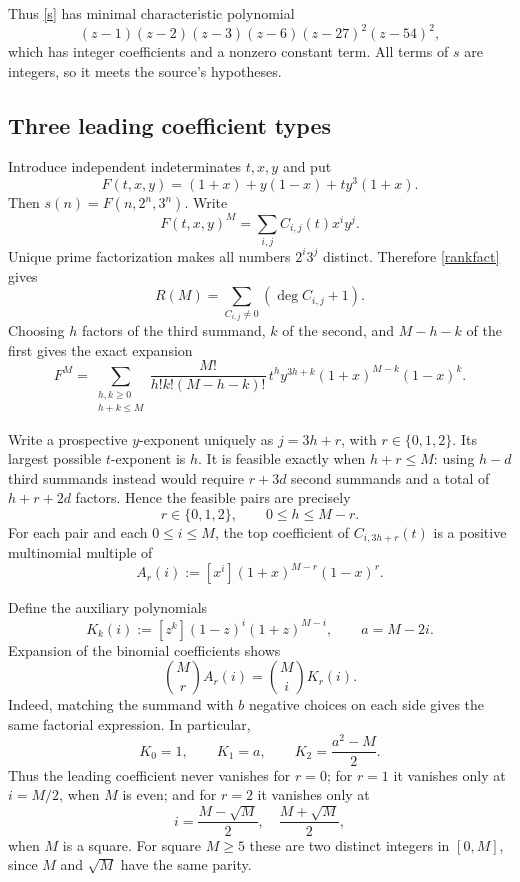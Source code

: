 \documentclass[11pt]{article}
\begin{document}
Thus \eqref{s} has minimal characteristic polynomial
\[
(z-1)(z-2)(z-3)(z-6)(z-27)^2(z-54)^2,
\]
which has integer coefficients and a nonzero constant term.
All terms of $s$ are integers, so it meets the source's hypotheses.

\subsection*{Three leading coefficient types}
Introduce independent indeterminates $t,x,y$ and put
\[
F(t,x,y)=(1+x)+y(1-x)+ty^3(1+x).
\]
Then $s(n)=F(n,2^n,3^n)$. Write
\[
F(t,x,y)^M=\sum_{i,j}C_{i,j}(t)x^iy^j.
\]
Unique prime factorization makes all numbers $2^i3^j$ distinct.
Therefore \eqref{rankfact} gives
\begin{equation}\label{sumrank}
R(M)=\sum_{C_{i,j}\ne0}(\deg C_{i,j}+1).
\end{equation}
Choosing $h$ factors of the third summand, $k$ of the second, and
$M-h-k$ of the first gives the exact expansion
\begin{equation}\label{expansion}
F^M=\sum_{\substack{h,k\ge0\\h+k\le M}}
\frac{M!}{h!k!(M-h-k)!}\,
t^hy^{3h+k}(1+x)^{M-k}(1-x)^k.
\end{equation}

Write a prospective $y$-exponent uniquely as $j=3h+r$, with
$r\in\{0,1,2\}$. Its largest possible $t$-exponent is $h$.
It is feasible exactly when $h+r\le M$: using $h-d$ third
summands instead would require $r+3d$ second summands and a total
of $h+r+2d$ factors. Hence the feasible pairs are precisely
\begin{equation}\label{feasible}
r\in\{0,1,2\},\qquad 0\le h\le M-r.
\end{equation}
For each pair and each $0\le i\le M$, the top coefficient of
$C_{i,3h+r}(t)$ is a positive multinomial multiple of
\[
A_r(i):=[x^i](1+x)^{M-r}(1-x)^r.
\]

Define the auxiliary polynomials
\[
K_k(i):=[z^k](1-z)^i(1+z)^{M-i},\qquad a=M-2i.
\]
Expansion of the binomial coefficients shows
\begin{equation}\label{dual}
\binom Mr A_r(i)=\binom Mi K_r(i).
\end{equation}
Indeed, matching the summand with $b$ negative choices on each side
gives the same factorial expression. In particular,
\begin{equation}\label{first}
K_0=1,\qquad K_1=a,\qquad K_2=\frac{a^2-M}{2}.
\end{equation}
Thus the leading coefficient never vanishes for $r=0$; for $r=1$
it vanishes only at $i=M/2$, when $M$ is even; and for $r=2$
it vanishes only at
\[
i=\frac{M-\sqrt M}{2},\quad \frac{M+\sqrt M}{2},
\]
when $M$ is a square. For square $M\ge5$ these are two distinct
integers in $[0,M]$, since $M$ and $\sqrt M$ have the same parity.
\end{document}
